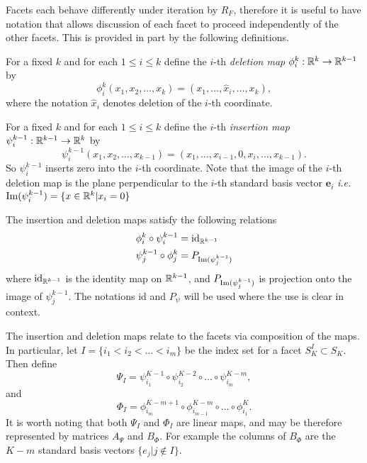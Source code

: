 \begin{rk}
	Facets each behave differently under iteration by \( R_F \), therefore it is useful to have notation that allows discussion of each facet to proceed independently of the other facets.  This is provided in part by the following definitions.
	\begin{defn}
		For a fixed \( k \) and for each \( 1\leq i\leq k \) define the \( i \)-th \textit{deletion map} \(\phi_{i}^{k}:\mathbb R^k\rightarrow \mathbb R^{k-1}\) by 
		\[ \phi_{i}^{k}(x_1,x_2,\ldots,x_k) = (x_1,\ldots,\hat{x}_i,\ldots,x_k), \] 
		where the notation \( \hat{x}_i \) denotes deletion of the \( i \)-th coordinate.
	\end{defn}

	\begin{defn}
		For a fixed \( k \) and for each \( 1\leq i\leq k \) define the \( i \)-th \textit{insertion map} \(\psi_i^{k-1}:\mathbb R^{k-1}\rightarrow\mathbb R^k\) by
		\[ \psi_i^{k-1}(x_1,x_2,\ldots,x_{k-1}) = (x_1,\ldots,x_{i-1},0,x_i,\ldots,x_{k-1}). \]
		So \(\psi_i^{k-1}\) inserts zero into the \( i \)-th coordinate. Note that the image of the \(i\)-th deletion map is the plane perpendicular to the \(i\)-th standard basis vector \( \bm e_i \) \textit{i.e.} \( \operatorname{Im}(\psi_i^{k-1}) = \{x\in\mathbb R^k|x_i = 0\} \)
	\end{defn}
	
	The insertion and deletion maps satisfy the following relations
	\begin{align}
	\phi_{i}^{k}\circ\psi_i^{k-1} &= \operatorname{id}_{\mathbb R^{k-1}} \label{eqn:insDel1}\\
	\psi_{j}^{k-1}\circ\phi_{j}^{k}&= P_{\operatorname{Im}(\psi_{j}^{k-1})}\label{eqn:insDel2}
	\end{align}
	where \( \operatorname{id}_{\mathbb R^{k-1}} \) is the identity map on \( \mathbb R^{k-1} \), and \( P_{\operatorname{Im}(\psi_{j}^{k-1})} \) is projection onto the image of \( \psi_j^{k-1} \). The notations id and \( P_{\psi} \) will be used where the use is clear in context.
	
	The insertion and deletion maps relate to the facets via composition of the maps. In particular, let \(I=\{i_1<i_2<\ldots<i_m\}\) be the index set for a facet \( S_K^{I}\subset S_K \). Then define
	\[ \Psi_I = \psi_{i_1}^{K-1}\circ\psi_{i_2}^{K-2}\circ\ldots\circ\psi_{i_m}^{K-m}, \]
	and 
	\[ \Phi_I = \phi_{i_m}^{K-m+1}\circ\phi_{i_{m-1}}^{K-m}\circ\ldots\circ\phi_{i_1}^{K}. \]
	It is worth noting that both \( \Psi_I \) and \( \Phi_I \) are linear maps, and may be therefore represented by matrices \( A_{\Psi} \) and \( B_{\Phi} \). For example the columns of \( B_{\Phi} \) are the \( K-m \) standard basis vectors \( \{e_j|j\notin I\} \).
	

\end{rk}
